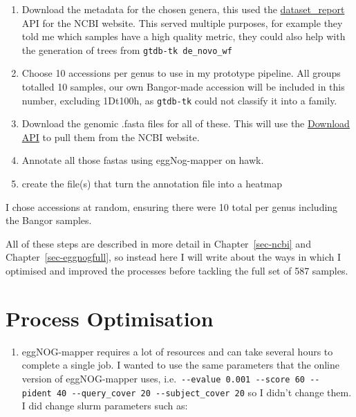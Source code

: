 \documentclass[
  letterpaper,
  DIV=11,
  numbers=noendperiod]{scrreprt}
\providecommand{\tightlist}{%
  \setlength{\itemsep}{0pt}\setlength{\parskip}{0pt}}\usepackage{longtable,booktabs,array}
\begin{document}
\begin{enumerate}
\def\labelenumi{\arabic{enumi}.}
\item
  Download the metadata for the chosen genera, this used the
  \href{https://www.ncbi.nlm.nih.gov/datasets/docs/v2/api/rest-api/\#get-/genome/accession/-accessions-/dataset_report}{dataset\_report}
  API for the NCBI website. This served multiple purposes, for example
  they told me which samples have a high quality metric, they could also
  help with the generation of trees from \texttt{gtdb-tk\ de\_novo\_wf}
\item
  Choose 10 accessions per genus to use in my prototype pipeline. All
  groups totalled 10 samples, our own Bangor-made accession will be
  included in this number, excluding 1Dt100h, as \texttt{gtdb-tk} could
  not classify it into a family.
\item
  Download the genomic .fasta files for all of these. This will use the
  \href{https://www.ncbi.nlm.nih.gov/datasets/docs/v2/api/rest-api/\#get-/genome/accession/-accessions-/download}{Download
  API} to pull them from the NCBI website.
\item
  Annotate all those fastas using eggNog-mapper on hawk.
\item
  create the file(s) that turn the annotation file into a heatmap
\end{enumerate}

I chose accessions at random, ensuring there were 10 total per genus
including the Bangor samples.

All of these steps are described in more detail in
Chapter~\ref{sec-ncbi} and Chapter~\ref{sec-eggnogfull}, so instead here
I will write about the ways in which I optimised and improved the
processes before tackling the full set of 587 samples.

\section{Process Optimisation}\label{process-optimisation}

\begin{enumerate}
\def\labelenumi{\arabic{enumi}.}
\tightlist
\item
  eggNOG-mapper requires a lot of resources and can take several hours
  to complete a single job. I wanted to use the same parameters that the
  online version of eggNOG-mapper uses,
  i.e.~\texttt{-\/-evalue\ 0.001\ -\/-score\ 60\ -\/-pident\ 40\ -\/-query\_cover\ 20\ -\/-subject\_cover\ 20}
  so I didn't change them. I did change slurm parameters such as:
\end{enumerate}
\end{document}
